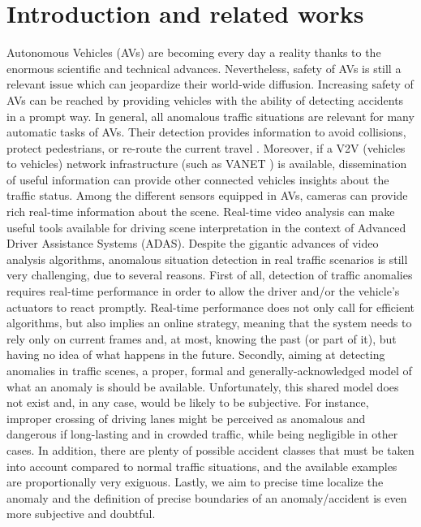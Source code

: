 \section{Introduction and related works}

Autonomous Vehicles (AVs) are becoming every day a reality thanks to the enormous scientific and technical advances.
Nevertheless, safety of AVs is still a relevant issue which can jeopardize their world-wide diffusion.
Increasing safety of AVs can be reached by providing vehicles with the ability of detecting accidents in a prompt way.
In general, all anomalous traffic situations are relevant for many automatic tasks of AVs.
Their detection provides information to avoid collisions, protect pedestrians, or re-route the current travel \cite{4298901}.
Moreover, if a V2V (vehicles to vehicles) network infrastructure (such as VANET \cite{fatemidokht2021efficient}) is available, dissemination of useful information can provide other connected vehicles insights about the traffic status.
Among the different sensors equipped in AVs, cameras can provide rich real-time information about the scene.
Real-time video analysis can make useful tools available for driving scene interpretation in the context of Advanced Driver Assistance Systems (ADAS).
Despite the gigantic advances of video analysis algorithms, anomalous situation detection in real traffic scenarios is still very challenging, due to several reasons.
First of all, detection of traffic anomalies requires real-time performance in order to allow the driver and/or the vehicle's actuators to react promptly.
Real-time performance does not only call for efficient algorithms, but also implies an online strategy, meaning that the system needs to rely only on current frames and, at most, knowing the past (or part of it), but having no idea of what happens in the future.
Secondly, aiming at detecting anomalies in traffic scenes, a proper, formal and generally-acknowledged model of what an anomaly is should be available.
Unfortunately, this shared model does not exist and, in any case, would be likely to be subjective.
For instance, improper crossing of driving lanes might be perceived as anomalous and dangerous if long-lasting and in crowded traffic, while being negligible in other cases.
In addition, there are plenty of possible accident classes that must be taken into account compared to normal traffic situations, and the available examples are proportionally very exiguous.
Lastly, we aim to precise time localize the anomaly and the definition of precise boundaries of an anomaly/accident is even more subjective and doubtful.
